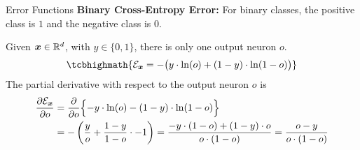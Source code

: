 \begin{frame}{Error Functions}
{\bf Binary Cross-Entropy Error:} For %
    binary classes, %
    the positive class is $1$
    and the negative class is $0$. %

	\medskip

Given %
	${\boldsymbol x} \in {\mathord{\mathbb R}}^d$, with %
	$y \in \{0,1\}$, there is only
    one output neuron $o$. %
    \begin{align*}
        \tcbhighmath{
        \cE_\bx = - \bigl( y \cdot \ln(o) 
            + (1-y) \cdot \ln(1-o) \bigr) 
        }
    \end{align*}
The partial derivative %
with respect to the output neuron $o$ is
\begin{align*}
    \frac{\partial {\mathcal E}_{\boldsymbol x}}{\partial o} & =
    \frac{\partial}{\partial o} \Bigl\{- y\cdot\ln(o) -
    (1-y)\cdot\ln(1-o) \Bigr\} \notag\\
    & = -\left(\frac{y}{o} + \frac{1-y}{1-o} \cdot -1\right)
         = \frac{-y \cdot (1-o) + (1-y)\cdot o} {o\cdot (1-o)} = \frac{o-y}{o \cdot (1-o)}
\end{align*}


\end{frame}
%
%
